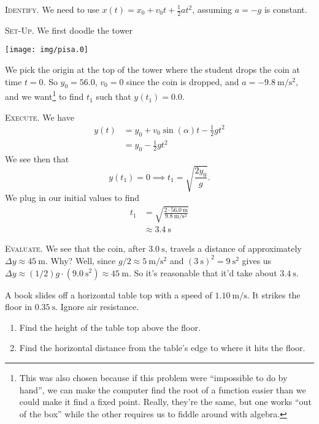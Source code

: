 \begin{soln}
\textsc{Identify.} We need to use
$x(t)=x_{0}+v_{0}t+\frac{1}{2}at^{2}$, assuming $a=-g$ is
constant. 

\textsc{Set-Up.}
We first doodle the tower
\begin{center}
  \texttt{[image: img/pisa.0]}
\end{center}
We pick the origin at the top of the tower where the student
drops the coin at time $t=0$. So $y_{0}=56.0$, $v_{0}=0$ since the
coin is dropped, and $a=\SI{-9.8}{\meter\per\second\squared}$, and we
want\footnote{This was also chosen because if this problem were
  ``impossible to do by hand'', we can make the computer find the root
  of a function easier than we could make it find a fixed point. Really,
they're the same, but one works ``out of the box'' while the other
requires us to fiddle around with algebra.} to find $t_{1}$ such that $y(t_{1})=0.0$.

\textsc{Execute.}
We have
\begin{equation}
\begin{split}
y(t) &= y_{0} + v_{0}\sin(\alpha)t - \frac{1}{2}gt^{2}\\
&=y_{0} - \frac{1}{2}gt^{2}
\end{split}
\end{equation}
We see then that
\begin{equation}
y(t_{1}) = 0\implies t_{1}=\sqrt{\frac{2y_{0}}{g}}.
\end{equation}
We plug in our initial values to find
\begin{equation}
\begin{split}
t_{1} &= \sqrt{\frac{2\cdot\SI{56.0}{\meter}}{\SI{9.8}{\meter\per\second\squared}}}\\
&\approx \SI{3.4}{\second}
\end{split}
\end{equation}

\textsc{Evaluate.}
We see that the coin, after $\SI{3.0}{\second}$, travels a distance
of approximately $\Delta y\approx \SI{45}{\meter}$. Why? Well,
since $g/2\approx \SI{5}{\meter/\second\squared}$ and 
$(\SI{3}{\second})^{2}=\SI{9}{\second\squared}$ gives us $\Delta y\approx(1/2)g\cdot(\SI{9.0}{\second\squared})\approx \SI{45}{\meter}$. So it's
reasonable that it'd take about $\SI{3.4}{\second}$.
\end{soln}

\makeatletter
{}
\makeatother
A book slides off a horizontal table top with a speed of
$\SI{1.10}{\meter/\second}$. It strikes the floor in
$\SI{0.35}{\second}$. Ignore air resistance.
\begin{enumerate}
\item Find the height of the table top above the floor.
\item Find the horizontal distance from the table's edge to where it
  hits the floor.
\end{enumerate}

